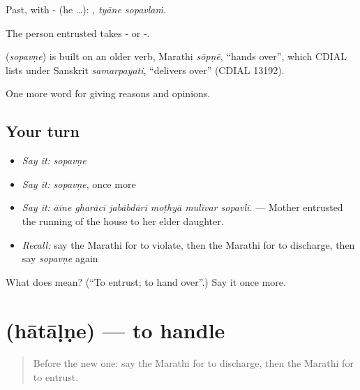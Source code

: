 Past, with - (he …):  , \emph{tyāne sopavlaṁ}.

The person entrusted takes - or -.

\begin{cousinweb}
\textbf{} (\emph{sopavṇe}) is built on an older verb, Marathi \emph{sõpṇẽ}, \textquotedblleft{}hands over\textquotedblright{}, which CDIAL lists under Sanskrit \emph{samarpayati}, \textquotedblleft{}delivers over\textquotedblright{} (CDIAL 13192).
\end{cousinweb}

\begin{grammarlens}[title={What you've built}]
One more word for giving reasons and opinions.
\end{grammarlens}

\subsection*{Your turn}
\begin{itemize}
\raggedright
  \item \emph{Say it:} \emph{sopavṇe}
  \item \emph{Say it:} \emph{sopavṇe}, once more
  \item \emph{Say it:} \emph{āīne gharācī jabābdārī moṭhyā mulīvar sopavlī.} — Mother entrusted the running of the house to her elder daughter.
  \item \emph{Recall:} say the Marathi for to violate, then the Marathi for to discharge, then say \emph{sopavṇe} again
\end{itemize}

\begin{tcolorbox}[breakable,colback=teal!4,colframe=teal!35!black,title={Before you move on}]
What does  mean? (\textquotedblleft{}To entrust; to hand over\textquotedblright{}.) Say it once more.
\end{tcolorbox}
\section[\texorpdfstring{\mr{हाताळणे} (hātāḷṇe)}{हाताळणे (hātāḷṇe)}]{ (hātāḷṇe) — to handle}

\label{lesson:MR-C368-hatalne}



\begin{quote}
Before the new one: say the Marathi for to discharge, then the Marathi for to entrust.
\end{quote}

